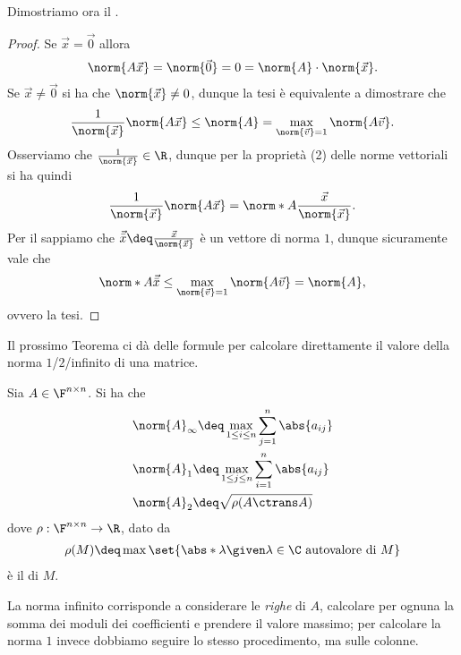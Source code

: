 Dimostriamo ora il .
\begin{proof}
    Se $\vec x = \vec 0$ allora \[
        \norm{A\vec x} = \norm{\vec 0} = 0 = \norm{A} \cdot \norm{\vec x}.
    \] Se $\vec x \neq \vec 0$ si ha che $\norm{\vec x} \neq 0$, dunque la tesi è equivalente a dimostrare che \[
        \frac1{\norm{\vec x}} \norm{A\vec x} \leq \norm{A} = \max_{\norm{\vec v} = 1} \norm{A\vec v}.
    \] Osserviamo che $\frac1{\norm{\vec x}} \in \R$, dunque per la proprietà (2) delle norme vettoriali si ha quindi \[
        \frac1{\norm{\vec x}} \norm{A\vec x} = \norm*{A\frac{\vec x}{\norm{\vec x}}}.
    \] Per il  sappiamo che $\vec{\bar x} \deq \frac{\vec x}{\norm{\vec x}}$ è un vettore di norma $1$, dunque sicuramente vale che \[
        \norm*{A\vec{\bar x}} \leq \max_{\norm{\vec v} = 1} \norm{A\vec v} = \norm{A},
    \] ovvero la tesi.
\end{proof}

Il prossimo Teorema ci dà delle formule per calcolare direttamente il valore della norma $1$/$2$/infinito di una matrice.

\begin{theorem}{}{}
    Sia $A \in \Mat{\F, n, n}$. Si ha che \begin{align*}
        &\norm{A}_\infty \deq \max_{1 \leq i \leq n} \sum_{j=1}^n \abs{a_{ij}}\\
        &\norm{A}_1 \deq \max_{1 \leq j \leq n} \sum_{i=1}^n \abs{a_{ij}}\\
        &\norm{A}_2 \deq \sqrt{\rho(A\ctrans A)}
    \end{align*} dove $\rho : \Mat{\F, n, n} \to \R$, dato da \begin{align*}
        \rho(M) \deq \max \set{\abs*{\lambda} \given \lambda \in \C \text{ autovalore di } M}
    \end{align*} è il  di $M$.
\end{theorem}

\begin{remark}
    La norma infinito corrisponde a considerare le \emph{righe} di $A$, calcolare per ognuna la somma dei moduli dei coefficienti e prendere il valore massimo; per calcolare la norma $1$ invece dobbiamo seguire lo stesso procedimento, ma sulle colonne.
\end{remark}

